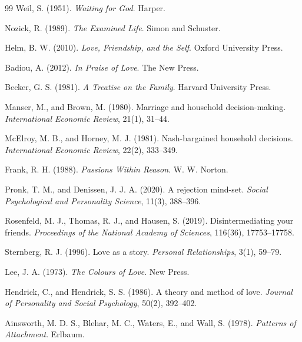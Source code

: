 \documentclass[11pt]{article}
\begin{document}
\begin{thebibliography}{99}
Weil, S. (1951).
\newblock \emph{Waiting for God}.
\newblock Harper.

Nozick, R. (1989).
\newblock \emph{The Examined Life}.
\newblock Simon and Schuster.

Helm, B. W. (2010).
\newblock \emph{Love, Friendship, and the Self}.
\newblock Oxford University Press.

Badiou, A. (2012).
\newblock \emph{In Praise of Love}.
\newblock The New Press.

Becker, G. S. (1981).
\newblock \emph{A Treatise on the Family}.
\newblock Harvard University Press.

Manser, M., and Brown, M. (1980).
\newblock Marriage and household decision-making.
\newblock \emph{International Economic Review}, 21(1), 31--44.

McElroy, M. B., and Horney, M. J. (1981).
\newblock Nash-bargained household decisions.
\newblock \emph{International Economic Review}, 22(2), 333--349.

Frank, R. H. (1988).
\newblock \emph{Passions Within Reason}.
\newblock W. W. Norton.

Pronk, T. M., and Denissen, J. J. A. (2020).
\newblock A rejection mind-set.
\newblock \emph{Social Psychological and Personality Science}, 11(3), 388--396.

Rosenfeld, M. J., Thomas, R. J., and Hausen, S. (2019).
\newblock Disintermediating your friends.
\newblock \emph{Proceedings of the National Academy of Sciences}, 116(36), 17753--17758.

Sternberg, R. J. (1996).
\newblock Love as a story.
\newblock \emph{Personal Relationships}, 3(1), 59--79.

Lee, J. A. (1973).
\newblock \emph{The Colours of Love}.
\newblock New Press.

Hendrick, C., and Hendrick, S. S. (1986).
\newblock A theory and method of love.
\newblock \emph{Journal of Personality and Social Psychology}, 50(2), 392--402.

Ainsworth, M. D. S., Blehar, M. C., Waters, E., and Wall, S. (1978).
\newblock \emph{Patterns of Attachment}.
\newblock Erlbaum.


\end{thebibliography}
\end{document}

